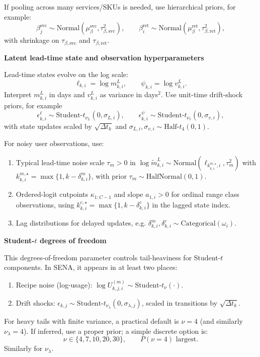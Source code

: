 \documentclass[11pt]{article}
\begin{document}
If pooling across many services/SKUs is needed, use hierarchical priors, for example:
\[
  \beta^{\mathrm{svc}}_j\sim\text{Normal}(\mu_{\beta}^{\mathrm{svc}},\tau_{\beta,\mathrm{svc}}^2),\qquad
  \beta^{\mathrm{ret}}_i\sim\text{Normal}(\mu_{\beta}^{\mathrm{ret}},\tau_{\beta,\mathrm{ret}}^2),
\]
with shrinkage on $\tau_{\beta,\mathrm{svc}}$ and $\tau_{\beta,\mathrm{ret}}$.

\textbf{Latent lead-time state and observation hyperparameters}

Lead-time states evolve on the log scale:
\[
  \ell_{k,i}=\log m^L_{k,i},\qquad \psi_{k,i}=\log v^L_{k,i}.
\]
Interpret $m^L_{k,i}$ in days and $v^L_{k,i}$ as variance in days$^2$.
Use unit-time drift-shock priors, for example
\[
  \epsilon^{\ell}_{k,i}\sim\text{Student-}t_{\nu_L}(0,\sigma_{L,i}),\qquad
  \epsilon^{\psi}_{k,i}\sim\text{Student-}t_{\nu_v}(0,\sigma_{v,i}),
\]
with state updates scaled by $\sqrt{\Delta t_k}$ and $\sigma_{L,i},\sigma_{v,i}\sim\text{Half-}t_{4}(0,1)$.

For noisy user observations, use:
\begin{enumerate}
  \item Typical lead-time noise scale $\tau_m>0$ in
  $\log\tilde m^L_{k,i}\sim\text{Normal}(\ell_{k^{m,\star}_{k,i},i},\tau_m^2)$ with
  $k^{m,\star}_{k,i}=\max\{1,k-\delta^m_{k,i}\}$,
  with prior $\tau_m\sim\text{HalfNormal}(0,1)$.
  \item Ordered-logit cutpoints $\kappa_{1:C-1}$ and slope $a_{1,i}>0$ for ordinal range class observations,
  using $k^{c,\star}_{k,i}=\max\{1,k-\delta^c_{k,i}\}$ in the lagged state index.
  \item Lag distributions for delayed updates, e.g. $\delta^m_{k,i},\delta^c_{k,i}\sim\text{Categorical}(\omega_i)$.
\end{enumerate}

\textbf{Student-$t$ degrees of freedom}

This degrees-of-freedom parameter controls tail-heaviness for Student-$t$ components.
In SENA, it appears in at least two places:
\begin{enumerate}
  \item Recipe noise (log-usage): $\log U^{(m)}_{k,j,i}\sim\text{Student-}t_{\nu}(\cdot)$.
  \item Drift shocks: $\epsilon_{k,j}\sim\text{Student-}t_{\nu_{\lambda}}(0,\sigma_{\lambda,j})$, scaled in transitions by $\sqrt{\Delta t_k}$.
\end{enumerate}

For heavy tails with finite variance, a practical default is $\nu=4$ (and similarly $\nu_{\lambda}=4$).
If inferred, use a proper prior; a simple discrete option is:
\[
  \nu \in \{4,7,10,20,30\},\qquad P(\nu=4)\text{ largest.}
\]
Similarly for $\nu_{\lambda}$.
\end{document}
